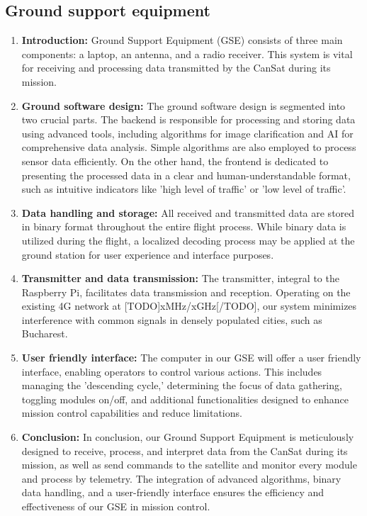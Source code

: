 \documentclass[11pt]{article}
\begin{document}
\subsection{Ground support equipment}
\begin{enumerate}
\item \textbf{Introduction:} {Ground Support Equipment (GSE) consists of three main components: a laptop, an antenna, and a radio receiver. This system is vital for receiving and processing data transmitted by the CanSat during its mission.}
\item \textbf{Ground software design:} {The ground software design is segmented into two crucial parts. The backend is responsible for processing and storing data using advanced tools, including algorithms for image clarification and AI for comprehensive data analysis. Simple algorithms are also employed to process sensor data efficiently. On the other hand, the frontend is dedicated to presenting the processed data in a clear and human-understandable format, such as intuitive indicators like 'high level of traffic' or 'low level of traffic'.}
\item \textbf{Data handling and storage:} {All received and transmitted data are stored in binary format throughout the entire flight process. While binary data is utilized during the flight, a localized decoding process may be applied at the ground station for user experience and interface purposes.}
\item \textbf{Transmitter and data transmission:} {The transmitter, integral to the Raspberry Pi, facilitates data transmission and reception. Operating on the existing 4G network at [TODO]xMHz/xGHz[/TODO], our system minimizes interference with common signals in densely populated cities, such as Bucharest.}
\item \textbf{User friendly interface:} {The computer in our GSE will offer a user friendly interface, enabling operators to control various actions. This includes managing the 'descending cycle,' determining the focus of data gathering, toggling modules on/off, and additional functionalities designed to enhance mission control capabilities and reduce limitations.}
\item \textbf{Conclusion:} {In conclusion, our Ground Support Equipment is meticulously designed to receive, process, and interpret data from the CanSat during its mission, as well as send commands to the satellite and monitor every module and process by telemetry. The integration of advanced algorithms, binary data handling, and a user-friendly interface ensures the efficiency and effectiveness of our GSE in mission control.}
\end{enumerate}
\end{document}
